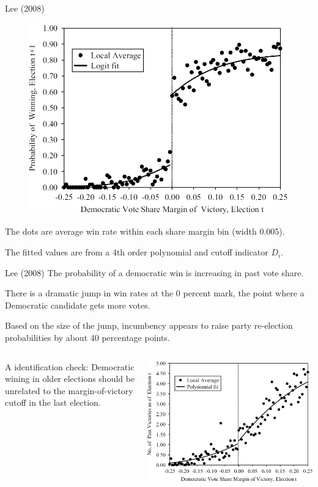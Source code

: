 \documentclass[handout]{beamer}
\begin{document}
\begin{frame}{Lee (2008)}
	\begin{figure}
		\centering
		\includegraphics[width=0.7\linewidth]{./Figures/Lee2008}
	\end{figure}
The dots are average win rate within each share margin bin (width 0.005).

The fitted values are from a 4th order polynomial and cutoff indicator $D_i$.	
\end{frame}

\begin{frame}{Lee (2008)}
	The probability of a democratic win is increasing in past vote share. \medskip
	
	There is a dramatic jump in win rates at the 0 percent mark, the point where a Democratic candidate gets more votes.\medskip 
	
	Based on the size of the jump, incumbency appears to raise party re-election probabilities by about 40 percentage points.
	\begin{columns}
		\begin{column}{.45\textwidth}
	A identification check: Democratic wining in older elections should be unrelated to the margin-of-victory cutoff in the last election.
		\end{column}
		\begin{column}{.55\textwidth}
		\includegraphics[width=\linewidth]{./Figures/Lee2008_}
		\end{column}
	\end{columns}	
\end{frame}
\end{document}
